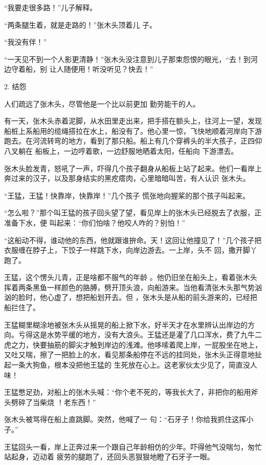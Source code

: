 \documentclass{article}
\begin{document}
“我要走很多路！”儿子解释。 

“两条腿生着，就是走路的！”张木头顶着儿
子。 


“我没有伴！” 

“一天见不到一个人影更清静！”张木头没注意到儿子那束怨恨的眼光，“去！到河边守着船，别
让人随便用！听没听见？快去！” 


2. 结怨 

人们疏远了张木头，尽管他是一个比以前更加
勤劳能干的人。 

有一天，张木头赤着泥脚，从水田里走出来，把手搭在额头上，往河上一望，发现船桩上系船用的缆绳搭拉在水上，船没有了。他心里一惊，飞快地顺着河岸向下游跑去。在河流转弯的地方，看到了那只船。船上有几个穿裤头的半大孩子，正四仰八叉躺在
\newpage
船板上，一边哼着歌，一边舒服地晒着太阳，任船向
下游漂去。 

张木头脸发青，怒吼了一声，吓得几个孩子翻身从船板上站了起来。他们一看岸上奔过来的汉子，以及那身结实的黑疙瘩肉，心里暗暗叫苦，有人认识
张木头。 

“王猛，王猛！快靠岸，快靠岸！”几个孩子
慌张地向握桨的那个孩子叫起来。 

“怎么啦？”那个叫王猛的孩子回头望了望，看见岸上的张木头已经脱去了衣服，正准备下水，便
叫起来：“你们怕啥？他咬人咋的？别怕！” 

“这船动不得，谁动他的东西，他就跟谁拚命。天！这回让他撞见了！”几个孩子把衣服缠在脖子上，下饺子一样跳下水，向岸边游去。一上岸，头不
回，撒开脚丫跑了。 

王猛，这个愣头儿青，正是啥都不服气的年龄
\newpage
。他仍旧坐在船头上，看着张木头挥着两条黑鱼一样颜色的胳膊，劈开顶头浪，向船游来。当他看清张木头那气势汹汹的脸时，他心虚了，想把船划开去。但
，张木头是从船的前头游来的，已经把船拦住了。 

王猛糊里糊涂地被张木头从摇晃的船上掀下水，好半天才在水里辨认出岸边的方向。亏得这是水势平缓的地方，没有大浪头。王猛还是灌了几口浑水，费了九牛二虎之力，快要抽筋的脚尖才触到岸边的浅滩。他哆嗦着爬上岸，一屁股坐在地上，又吐又喘，擦了一把脸上的水，看见那条船停在不远的挂同处，张木头正得意地扯起一条大狗鱼，根本没把他王猛的
生死放在心上。这老家伙太少见了，简直没人味！ 

王猛憋足劲，对船上的张木头喊：“你个老不死的，等我长大了，非把你的船用斧头劈碎了当柴烧
！老东西！” 

张木头被骂得在船上直跳脚。突然，他喊了一
句：“石牙子！你给我抓住这挥小子。” 

\newpage

王猛回头一看，岸上正奔过来一个跟自己年龄相仿的少年。吓得他气没喘匀，匆忙站起身，迈动着
疲劳的腿跑了，还回头恶狠狠地瞪了石牙子一眼。 
\end{document}
